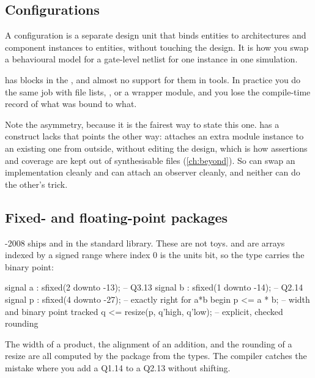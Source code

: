 \subsection{Configurations}

A \VHDL{} configuration is a separate design unit that binds entities to
architectures and component instances to entities, without touching the
design. It is how you swap a behavioural model for a gate-level netlist for
one instance in one simulation.

\SV{} has  blocks in the \LRM{}, and almost no support for them
in tools. In practice you do the same job with file lists,
, or a wrapper module, and you lose the compile-time record of
what was bound to what.

Note the asymmetry, because it is the fairest way to state this one. \SV{} has
a construct \VHDL{} lacks that points the other way:  attaches an
extra module instance to an existing one from outside, without editing the
design, which is how assertions and coverage are kept out of synthesisable
files (\cref{ch:beyond}). So \VHDL{} can swap an implementation cleanly and
\SV{} can attach an observer cleanly, and neither can do the other's trick.

\subsection{Fixed- and floating-point packages}

\VHDL{}-2008 ships  and  in the
standard library. These are not toys.  and  are
arrays indexed by a signed range where index 0 is the units bit, so the type
carries the binary point:

\begin{vhdlcode}
signal a : sfixed(2 downto -13);   -- Q3.13
signal b : sfixed(1 downto -14);   -- Q2.14
signal p : sfixed(4 downto -27);   -- exactly right for a*b
begin
  p <= a * b;                      -- width and binary point tracked
  q <= resize(p, q'high, q'low);   -- explicit, checked rounding
\end{vhdlcode}

The width of a product, the alignment of an addition, and the rounding of a
resize are all computed by the package from the types. The compiler catches
the mistake where you add a Q1.14 to a Q2.13 without shifting.


